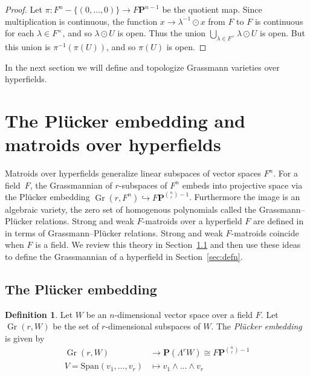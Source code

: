 \documentclass[10pt, preprint]{article}
\theoremstyle{definition}
\newtheorem{definition}[theorem]{Definition}
\begin{document}
\begin{proof}
Let $\pi : F^{n}-\{(0,\ldots ,0)\}\to F\mathbf{P}^{n-1}$ be the quotient
map. Since multiplication is continuous, the function $x\to \lambda
^{-1} \odot x$ from $F$ to $F$ is continuous for each $\lambda \in F
^{\times }$, and so $\lambda \odot U$ is open. Thus the union
$\bigcup _{\lambda \in F^{\times }}\lambda \odot U$ is open. But this
union is $\pi ^{-1}(\pi (U))$, and so $\pi (U)$ is open.
\end{proof}

In the next section we will define and topologize Grassmann varieties
over hyperfields.

\section{The Pl\"{u}cker embedding and matroids over hyperfields}

Matroids over hyperfields generalize linear subspaces of vector spaces
$F^{n}$. For a field~$F$, the Grassmannian of $r$-subspaces of
$F^{n}$ embeds into projective space via the Pl\"{u}cker embedding
$\operatorname{Gr}(r,F^{n}) \hookrightarrow F\mathbf{P}^{
\binom{n }{r}-1}$. Furthermore the image is an algebraic variety, the
zero set of homogenous polynomials called the Grassmann--Pl\"{u}cker
relations. Strong and weak $F$-matroids over a hyperfield $F$ are
defined in~\cite{Baker-Bowler} in terms of Grassmann--Pl\"{u}cker
relations. Strong and weak $F$-matroids coincide when $F$ is a field.
We review this theory in Section~\ref{sec:plucker} and then use these
ideas to define the Grassmannian of a hyperfield in
Section~\ref{sec:defn}.

\subsection{The Pl\"{u}cker embedding}%
\label{sec:plucker}

\begin{definition}
Let $W$ be an $n$-dimensional vector space over a field $F$. Let
$\operatorname{Gr}(r,W)$ be the set of $r$-dimensional subspaces of
$W$. The \emph{Pl\"{u}cker embedding} is given by
%
\begin{align*}
\operatorname{Gr}(r,W)
& \to \mathbf{P}(\Lambda ^{r} W)\cong F
\mathbf{P}^{\binom{n}{r}-1}
\\
V = \text{Span}(v_{1}, \dots , v_{r})
& \mapsto v_{1} \wedge \dots
\wedge v_{r}
\end{align*}
%
\end{definition}
\end{document}
